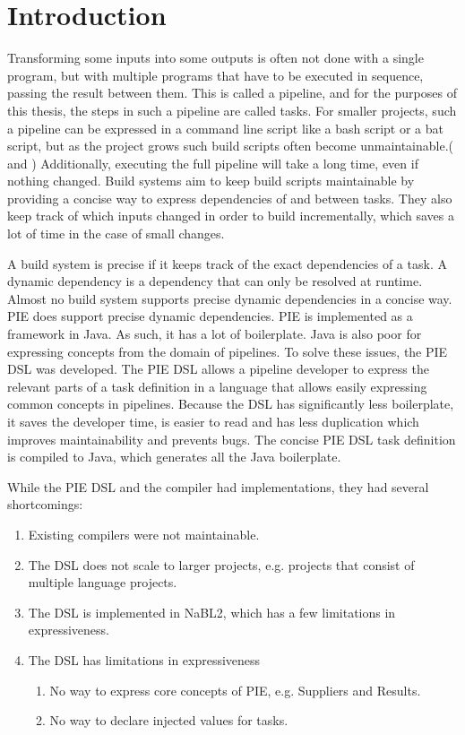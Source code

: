 
\section{Introduction}
\label{sec:introduction}

Transforming some inputs into some outputs is often not done with a single program, but with multiple programs that have to be executed in sequence, passing the result between them.
This is called a pipeline, and for the purposes of this thesis, the steps in such a pipeline are called tasks.
For smaller projects, such a pipeline can be expressed in a command line script like a bash script or a bat script, but as the project grows such build scripts often become unmaintainable.(\cite{Hatch2018} and \cite{Moodie2006})
Additionally, executing the full pipeline will take a long time, even if nothing changed.
Build systems aim to keep build scripts maintainable by providing a concise way to express dependencies of and between tasks.
They also keep track of which inputs changed in order to build incrementally, which saves a lot of time in the case of small changes.

A build system is precise if it keeps track of the exact dependencies of a task.
A dynamic dependency is a dependency that can only be resolved at runtime.
Almost no build system supports precise dynamic dependencies in a concise way.
PIE does support precise dynamic dependencies.
PIE is implemented as a framework in Java.
As such, it has a lot of boilerplate.
Java is also poor for expressing concepts from the domain of pipelines.
To solve these issues, the PIE DSL was developed.
The PIE DSL allows a pipeline developer to express the relevant parts of a task definition in a language that allows easily expressing common concepts in pipelines.
Because the DSL has significantly less boilerplate, it saves the developer time, is easier to read and has less duplication which improves maintainability and prevents bugs. 
The concise PIE DSL task definition is compiled to Java, which generates all the Java boilerplate.

While the PIE DSL and the compiler had implementations, they had several shortcomings:
\begin{enumerate}
  \item Existing compilers were not maintainable.
  \item The DSL does not scale to larger projects, e.g. projects that consist of multiple language projects.
  \item The DSL is implemented in NaBL2, which has a few limitations in expressiveness.
  \item The DSL has limitations in expressiveness
  \begin{enumerate}
    \item No way to express core concepts of PIE, e.g. Suppliers and Results.
    \item No way to declare injected values for tasks.
  \end{enumerate}
\end{enumerate}

